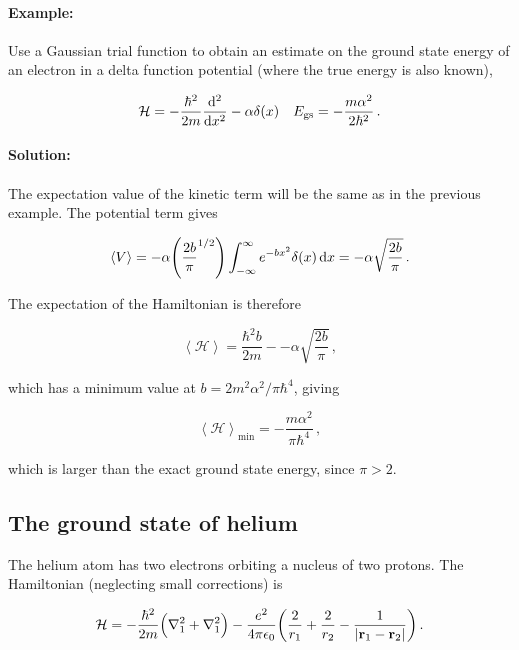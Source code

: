 \documentclass[12pt, titlepage]{article}
\newcommand{\exv}[1]{\left\langle #1 \right\rangle}
\begin{document}
\begin{mdframed}[backgroundcolor=gray!20]
\paragraph*{Example:}
Use a Gaussian trial function to obtain an estimate on the ground state energy of an electron in a delta function potential (where the true energy is also known),

\begin{equation*}
	\mathcal{H} = -\frac{\hbar^2}{2m}\dv[2]{x} - \alpha\delta(x) \quad E_\text{gs} = -\frac{m\alpha^2}{2\hbar^2} \,.
\end{equation*}

\paragraph*{Solution:}
The expectation value of the kinetic term will be the same as in the previous example. The potential term gives

\begin{equation*}
	\exv{V} = -\alpha\qty(\frac{2b}{\pi}^{1/2})\int_{-\infty}^{\infty}e^{-bx^2}\delta(x)\dd{x} = -\alpha\sqrt{\frac{2b}{\pi}} \,.
\end{equation*}

The expectation of the Hamiltonian is therefore

\begin{equation*}
	\exv{\mathcal{H}} = \frac{\hbar^2b}{2m} - -\alpha\sqrt{\frac{2b}{\pi}}\,,
\end{equation*}

which has a minimum value at $b = 2m^2\alpha^2/\pi\hbar^4$, giving

\begin{equation*}
	\exv{\mathcal{H}}_\text{min} = -\frac{m\alpha^2}{\pi\hbar^4} \,,
\end{equation*}

which is larger than the exact ground state energy, since $\pi>2$.
\end{mdframed}

\subsection{The ground state of helium}
The helium atom has two electrons orbiting a nucleus of two protons. The Hamiltonian (neglecting small corrections) is 

\begin{equation}
	\mathcal{H} = -\frac{\hbar^2}{2m}\Bigl(\laplacian{}_1 + \laplacian{}_1\Bigr) - \frac{e^2}{4\pi\epsilon_0}\qty(\frac{2}{r_1} + \frac{2}{r_2} - \frac{1}{|\vb{r}_1 - \vb{r}_2|}) \,.
\end{equation}
\end{document}
